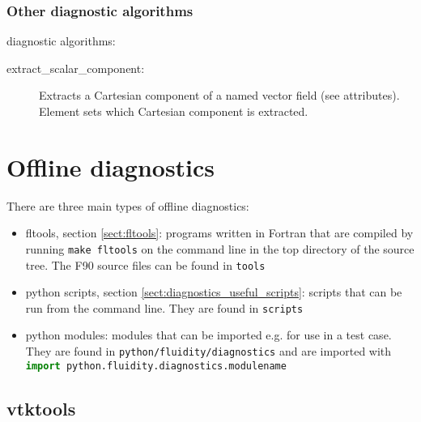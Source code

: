 \subsubsection{Other diagnostic algorithms}

 diagnostic algorithms:

\begin{description}
\item[extract\_scalar\_component:] Extracts a Cartesian component of a
  named vector field (see attributes). Element  sets 
  which Cartesian component is extracted.
\end{description}



\section{Offline diagnostics}
\label{sect:offline_diagnostics}

There are three main types of offline diagnostics:
\begin{itemize}
\item fltools, section \ref{sect:fltools}: programs written in Fortran that are compiled by running \lstinline[language = XML]+make fltools+ on the command line in the top directory of the \fluidity source tree. The F90 source files can be found in \lstinline[language = XML]+tools+
\item python scripts, section \ref{sect:diagnostics_useful_scripts}: scripts that can be run from the command line. They are found in \lstinline[language = XML]+scripts+
\item python modules: modules that can be imported e.g. for use in a test case. They are found in \lstinline[language = XML]+python/fluidity/diagnostics+ and are imported with  \\ \lstinline[language = python]+import python.fluidity.diagnostics.modulename+
\end{itemize}

\subsection{vtktools}
\label{sect:diagnostics_vtk_tools}

